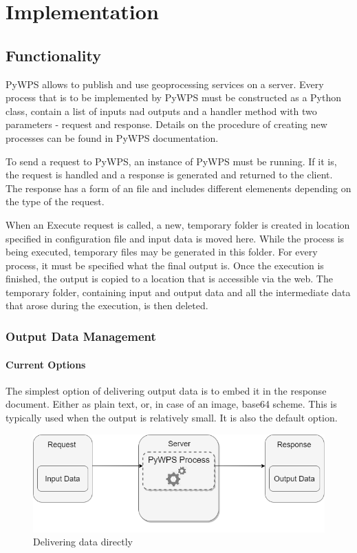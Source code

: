 \chapter{Implementation}
\label{4-practical}

\section{Functionality} 

PyWPS allows to publish and use geoprocessing services on a
server. Every process that is to be implemented by PyWPS must be
constructed as a Python class, contain a list of inputs nad outputs
and a handler method with two parameters - request and
response. \cite{pywpsprocess} Details on the procedure of creating new
processes can be found in PyWPS documentation.

To send a request to PyWPS, an instance of PyWPS must be running. If
it is, the request is handled and a response is generated and returned
to the client. The response has a form of an  file and
includes different elemenents depending on the type of the request.

When an Execute request is called, a new, temporary folder is created
in location specified in configuration file and input data is moved
here. While the process is being executed, temporary files may be
generated in this folder. For every process, it must be specified what
the final output is. Once the execution is finished, the output is
copied to a location that is accessible via the web. The temporary
folder, containing input and output data and all the intermediate data
that arose during the execution, is then deleted.

\subsection{Output Data Management}

\subsubsection{Current Options} 

The simplest option of delivering output data is to embed it in the
 response document. Either as plain text,  or, in case
of an image, base64 scheme. This is typically used when the output is
relatively small. It is also the default option.

\begin{figure}[H] \centering
      \includegraphics[width=350pt]{./pictures/optionone.png}
      \caption[Delivering data directly]{Delivering data directly}
      \label{fig:optionone}
  \end{figure}

